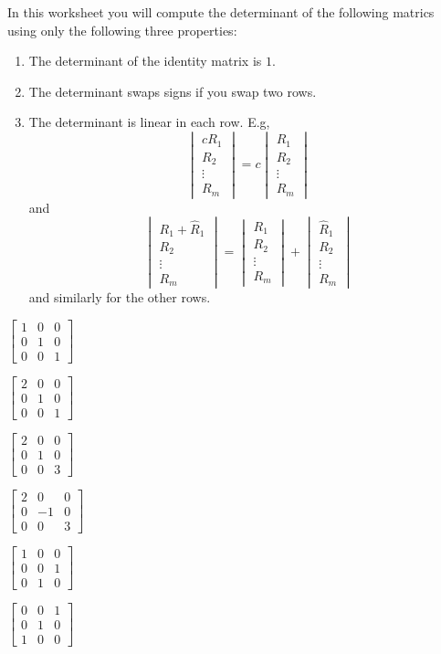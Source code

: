 \documentclass[minion]{homework}
\def\trmat#1#2#3|#4#5#6|#7#8#9{\begin{bmatrix}#1&#2&#3\\#4&#5&#6\\#7&#8&#9\end{bmatrix}}
\begin{document}
\vskip -0.5cm

\begin{aproblems}

In this worksheet you will compute the determinant of the following 
matrics using only the following three properties:
\begin{enumerate}
	\item The determinant of the identity matrix is $1$.
	\item The determinant swaps signs if you swap two rows.
	\item The determinant is linear in each row. E.g,
	\[
	\begin{vmatrix} c R_1 \\ R_2 \\ \vdots\\ R_m \end{vmatrix} = c \begin{vmatrix}  R_1 \\ R_2 \\ \vdots\\ R_m \end{vmatrix}
	\]
	and
	\[
	\begin{vmatrix} R_1 + \hat R_1 \\ R_2 \\ \vdots\\ R_m \end{vmatrix} =  \begin{vmatrix}  R_1 \\ R_2 \\ \vdots\\ R_m \end{vmatrix}
    +
	\begin{vmatrix} \hat R_1 \\ R_2 \\ \vdots\\ R_m \end{vmatrix}
	\]
	and similarly for the other rows.
\end{enumerate}

\aproblem \qquad $\displaystyle\trmat100|010|001$

\aproblem \qquad $\displaystyle\trmat200|010|001$

\aproblem \qquad $\displaystyle\trmat200|010|003$

\aproblem \qquad $\displaystyle\trmat200|0{-1}0|003$

\aproblem \qquad $\displaystyle\trmat100|001|010$

\aproblem \qquad $\displaystyle\trmat001|010|100$


\end{aproblems}
\end{document}
